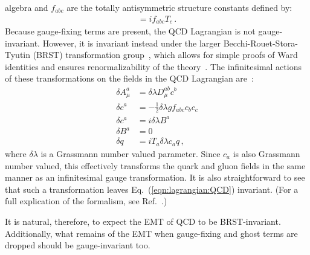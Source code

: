 \documentclass[prd,preprint,
  showpacs,showkeys,lengthcheck,
  nofootinbib,tightenlines,onecolumn,notitlepage,
  preprintnumbers,superscriptaddress]{revtex4-1}
\begin{document}
algebra and $f_{abc}$ are the totally antisymmetric structure constants
defined by:
\begin{align}
  [T_a, T_b] = i f_{abc} T_c
  \,.
\end{align}
Because gauge-fixing terms are present,
the QCD Lagrangian is not gauge-invariant.
However, it is invariant instead under the larger
Becchi-Rouet-Stora-Tyutin (BRST) transformation
group~\cite{Becchi:1974md,Becchi:1975nq,Tyutin:1975qk},
which allows for simple proofs of Ward identities
and ensures renormalizability of the theory~\cite{Collins:1984xc}.
The infinitesimal actions of these transformations on the fields
in the QCD Lagrangian are~\cite{Becchi:1974md,Becchi:1975nq,Tyutin:1975qk,Kugo:1979gm}:
\begin{subequations}
  \begin{align}
    \delta A_\mu^a
    &=
    \delta\lambda
    D_\mu^{ab} c^b
    \\
    \delta c^a
    &=
    -
    \frac{1}{2}
    \delta\lambda
    g f_{abc} c_b c_c
    \\
    \delta c^a
    &=
    i
    \delta\lambda
    B^a
    \\
    \delta B^a
    &=
    0
    \\
    \delta q
    &=
    i T_a \delta\lambda c_a q
    \,,
  \end{align}
\end{subequations}
where $\delta\lambda$ is a Grassmann number valued parameter.
Since $c_a$ is also Grassmann number valued, this effectively
transforms the quark and gluon fields in the same manner as
an infinitesimal gauge transformation.
It is also straightforward to see that such a transformation
leaves Eq.~(\ref{eqn:lagrangian:QCD}) invariant.
(For a full explication of the formalism,
see Ref.~\cite{Kugo:1979gm}.)

It is natural, therefore, to expect the EMT of QCD to be BRST-invariant.
Additionally, what remains of the EMT when gauge-fixing and ghost terms
are dropped should be gauge-invariant too.
\end{document}
